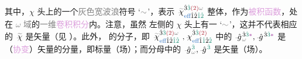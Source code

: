 其中，$\chi$ 头上的一个\textcolor{gray}{灰色宽波浪}符号 `$\mathcolor{gray}{\sim}$'，表示 $\textcolor{gray}{\xint{{}^{}_{\mathcolor{gray}{-}}}{23}{\widetilde{\textcolor{black}{\chi}}}}^{ \hat{3} \textcolor{PineGreen}{\hat{3}} \textcolor{Maroon}{(2)} \mathcolor{gray}{\omega} }_{ \textcolor{NavyBlue}{\text{eff}} \hat{1} \hat{2} \textcolor{PineGreen}{\hat{1} \hat{2}} }$ 整体，作为\textcolor{Plum}{被积函数}，处在 \textcolor{gray}{$\omega$ 域}的\textcolor{gray}{一维}\textcolor{Plum}{卷积积分}内。注意，虽然  左侧的 $\chi$ 头上有一 `$\mathcolor{gray}{\sim}$'，这并不代表相应的 $\textcolor{gray}{\xint{{}^{}_{\mathcolor{gray}{-}}}{23}{\widetilde{\textcolor{black}{\chi}}}}$ 是矢量（见 ）。此外， 的分子，即 $\textcolor{gray}{\xint{{}^{}_{\mathcolor{gray}{-}}}{23}{\widetilde{\textcolor{black}{\chi}}}}^{ \hat{3} \textcolor{PineGreen}{\hat{3}} \textcolor{Maroon}{(2)} \mathcolor{gray}{\omega} }_{ \textcolor{NavyBlue}{\text{eff}} \hat{1} \hat{2} \textcolor{PineGreen}{\hat{1} \hat{2}} }~, \xint{{}^{}_{\mathcolor{gray}{-}}}{23}{\chi}^{\hat{3} \textcolor{PineGreen}{\hat{3}} \textcolor{Maroon}{(2)} }_{\textcolor{NavyBlue}{\text{eff}} \hat{1} \textcolor{PineGreen}{\hat{1}} \hat{2} \textcolor{PineGreen}{\hat{2}} }$ 中的 $\xint{{}^{}_{\mathcolor{gray}{-}}}{10}{\hat{g}}^{\;\! \hat{3} \textcolor{PineGreen}{\hat{3}} \textcolor{Plum}{*}}_{\;\! \mathcolor{gray}{\omega}}, \xint{{}^{}_{\mathcolor{gray}{-}}}{10}{\hat{g}}^{\;\! \hat{3} \textcolor{PineGreen}{\hat{3}} \textcolor{Plum}{*}}_{\;\! }$ 是（\textcolor{Plum}{协变}）矢量的分量，即标量（场）；而分母中的 $\xint{{}^{}_{\mathcolor{gray}{-}}}{10}{\hat{g}}^{\;\! \textcolor{PineGreen}{\hat{3}}}_{\;\! \mathcolor{gray}{\omega}}, \xint{{}^{}_{\mathcolor{gray}{-}}}{10}{\hat{g}}^{\;\! \textcolor{PineGreen}{\hat{3}}}$ 是矢量（场）。

